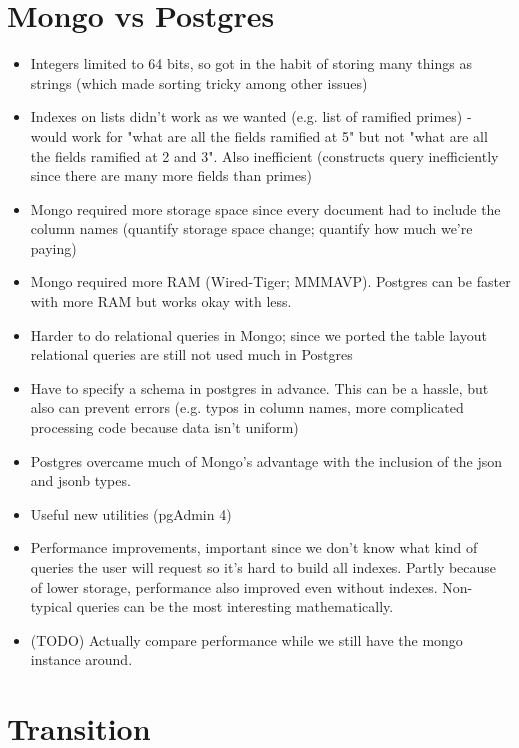 \documentclass{article}
\begin{document}
\section{Mongo vs Postgres}

\begin{itemize}
\item Integers limited to 64 bits, so got in the habit of storing many things as strings (which made sorting tricky among other issues)
\item Indexes on lists didn't work as we wanted (e.g. list of ramified primes) - would work for "what are all the fields ramified at 5" but not "what are all the fields ramified at 2 and 3".  Also inefficient (constructs query inefficiently since there are many more fields than primes)
\item Mongo required more storage space since every document had to include the column names (quantify storage space change; quantify how much we're paying)
\item Mongo required more RAM (Wired-Tiger; MMMAVP). Postgres can be faster with more RAM but works okay with less.
\item Harder to do relational queries in Mongo; since we ported the table layout relational queries are still not used much in Postgres
\item Have to specify a schema in postgres in advance.  This can be a hassle, but also can prevent errors (e.g. typos in column names, more complicated processing code because data isn't uniform)
\item Postgres overcame much of Mongo's advantage with the inclusion of the json and jsonb types.
\item Useful new utilities (pgAdmin 4)
\item Performance improvements, important since we don't know what kind of queries the user will request so it's hard to build all indexes.  Partly because of lower storage, performance also improved even without indexes.  Non-typical queries can be the most interesting mathematically.
\item (TODO) Actually compare performance while we still have the mongo instance around.
\end{itemize}

\section{Transition}
\end{document}
